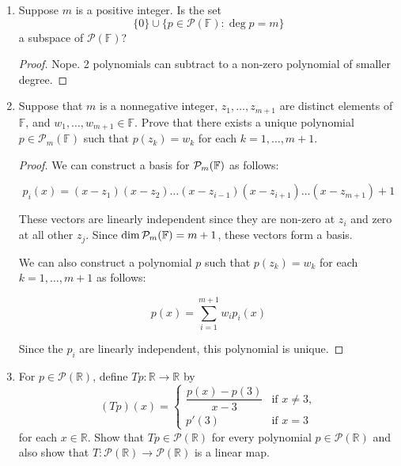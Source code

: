 \begin{enumerate}
\begin{proof}
            Take square roots and we're done!
        \end{proof}

        \item[4] Suppose $m$ is a positive integer. Is the set
\[
\{0\} \cup \{p \in \mathcal{P}(\mathbb{F}) : \deg p = m\}
\]
a subspace of $\mathcal{P}(\mathbb{F})$?

\begin{proof}
    Nope. 2 polynomials can subtract to a non-zero polynomial of smaller degree.
\end{proof}

\item[7] Suppose that $m$ is a nonnegative integer, $z_1, \dots, z_{m+1}$ are distinct elements of $\mathbb{F}$, and $w_1, \dots, w_{m+1} \in \mathbb{F}$. Prove that there exists a unique polynomial $p \in \mathcal{P}_m(\mathbb{F})$ such that $p(z_k) = w_k$ for each $k = 1, \dots, m + 1$.

    \begin{proof}
        We can construct a basis for $\mathcal P_m(\mathbb{F})$ as follows:

        \[
        p_i(x) = (x - z_1)(x - z_2) \dots (x - z_{i-1})(x - z_{i+1}) \dots (x - z_{m+1}) + 1
        \]

        These vectors are linearly independent since they are non-zero at $z_i$ and zero at all other $z_j$. Since $\dim \mathcal P_m(\mathbb{F}) = m + 1$, these vectors form a basis.

        We can also construct a polynomial $p$ such that $p(z_k) = w_k$ for each $k = 1, \dots, m + 1$ as follows:

        \[
        p(x) = \sum_{i=1}^{m+1} w_i p_i(x)
        \]

        Since the $p_i$ are linearly independent, this polynomial is unique.
    \end{proof}


    \item[10] For $p \in \mathcal{P}(\mathbb{R})$, define $Tp\colon \mathbb{R} \to \mathbb{R}$ by
    \[
    (Tp)(x) =
    \begin{cases}
        \dfrac{p(x) - p(3)}{x - 3} & \text{if } x \neq 3,\\
        p'(3) & \text{if } x = 3
    \end{cases}
    \]
    for each $x \in \mathbb{R}$. Show that $Tp \in \mathcal{P}(\mathbb{R})$ for every polynomial $p \in \mathcal{P}(\mathbb{R})$ and also show that $T\colon \mathcal{P}(\mathbb{R}) \to \mathcal{P}(\mathbb{R})$ is a linear map.


\end{enumerate}
